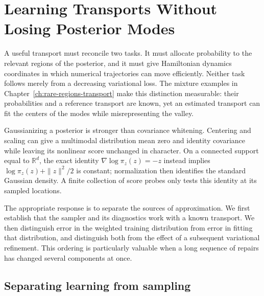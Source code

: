\chapter[Learning Transports Without Losing Modes]{Learning Transports Without Losing Posterior Modes}
\label{ch:neutra-controlled-training}

A useful transport must reconcile two tasks. It must allocate probability to
the relevant regions of the posterior, and it must give Hamiltonian dynamics
coordinates in which numerical trajectories can move efficiently. Neither
task follows merely from a decreasing variational loss. The mixture examples
in Chapter~\ref{ch:rare-regions-transport} make this distinction measurable:
their probabilities and a reference transport are known, yet an estimated
transport can fit the centers of the modes while misrepresenting the valley.

Gaussianizing a posterior is stronger than covariance whitening. Centering
and scaling can give a multimodal distribution mean zero and identity
covariance while leaving its nonlinear score unchanged in character. On a
connected support equal to $\mathbb R^d$, the exact identity
$\nabla\log\pi_z(z)=-z$ instead implies
$\log\pi_z(z)+\|z\|^2/2$ is constant; normalization then identifies the
standard Gaussian density. A finite collection of score probes only tests
this identity at its sampled locations.

The appropriate response is to separate the sources of approximation. We first
establish that the sampler and its diagnostics work with a known transport.
We then distinguish error in the weighted training distribution from error in
fitting that distribution, and distinguish both from the effect of a subsequent
variational refinement. This ordering is particularly valuable when a long
sequence of repairs has changed several components at once.

\section[An exact transport control]{Separating learning from sampling}

